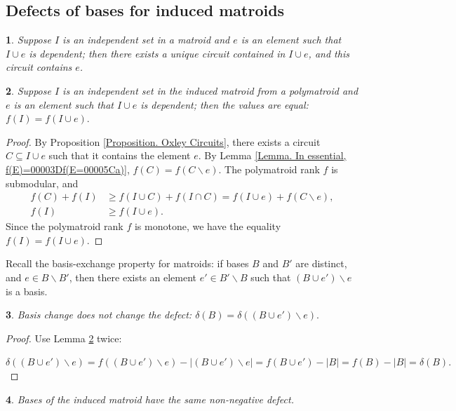 \documentclass[11pt]{article}
\theoremstyle{plain}
\newtheorem{thm}{\protect\theoremname}[section]
\theoremstyle{definition}
\theoremstyle{remark}
\theoremstyle{plain}
\newtheorem{lem}[thm]{\protect\lemmaname}
\theoremstyle{plain}
\newtheorem{prop}[thm]{\protect\propositionname}
\theoremstyle{plain}
\theoremstyle{definition}
\providecommand{\lemmaname}{Lemma}
\providecommand{\propositionname}{Proposition}
\providecommand{\theoremname}{Theorem}
\begin{document}
\subsection{Defects of bases for induced matroids}
\begin{prop}
\textup{\label{Proposition. Oxley Circuits}\cite{oxley_matroid_2011}}
Suppose $I$ is an independent set in a matroid and $e$ is an element
such that $I\cup e$ is dependent; then there exists a unique circuit
contained in $I\cup e$, and this circuit contains $e$.
\end{prop}

\begin{lem}
\label{Lemma. Value of f equal}Suppose $I$ is an independent set
in the induced matroid from a polymatroid and $e$ is an element such
that $I\cup e$ is dependent; then the values are equal: $f(I)=f(I\cup e).$
\end{lem}

\begin{proof}
By Proposition \ref{Proposition. Oxley Circuits}, there exists a
circuit $C\subseteq I\cup e$ such that it contains the element $e$.
By Lemma \ref{Lemma. In essential, f(E)=00003Df(E=00005Ca)}, $f(C)=f(C\backslash e).$
The polymatroid rank $f$ is submodular, and
\begin{align*}
f(C)+f(I) & \geq f(I\cup C)+f(I\cap C)=f(I\cup e)+f(C\backslash e),\\
f(I) & \geq f(I\cup e).
\end{align*}
Since the polymatroid rank $f$ is monotone, we have the equality
$f(I)=f(I\cup e).$
\end{proof}
Recall the basis-exchange property for matroids: if bases $B$ and
$B'$ are distinct, and $e\in B\backslash B'$, then there exists
an element $e'\in B'\backslash B$ such that $(B\cup e')\backslash e$
is a basis.
\begin{lem}
\label{Lemma. Basis change}Basis change does not change the defect:
$\delta(B)=\delta((B\cup e')\backslash e).$
\end{lem}

\begin{proof}
Use Lemma \ref{Lemma. Value of f equal} twice:

$\delta((B\cup e')\backslash e)=f((B\cup e')\backslash e)-|(B\cup e')\backslash e|=f(B\cup e')-|B|=f(B)-|B|=\delta(B).$
\end{proof}
\begin{thm}
\label{Theorem. Basis have the same defect}Bases of the induced matroid
have the same non-negative defect.
\end{thm}
\end{document}
